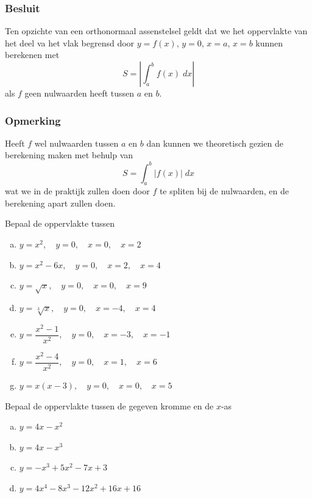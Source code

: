 \documentclass[a4paper,12pt, twoside]{article}
\begin{document}
\subsubsection*{Besluit}

Ten opzichte van een orthonormaal assenstelsel geldt dat we het oppervlakte van het deel va het vlak begrensd door $y=f(x)$, $y=0$, $x=a$, $x=b$ kunnen berekenen met
$$S = |\int_a^b f(x)\;dx|$$
als $f$ geen nulwaarden heeft tussen $a$ en $b$.

\subsubsection*{Opmerking}

Heeft $f$ wel nulwaarden tussen $a$ en $b$ dan kunnen we theoretisch gezien de berekening maken met behulp van
$$S = \int_a^b |f(x)|\;dx$$
wat we in de praktijk zullen doen door $f$ te spliten bij de nulwaarden, en de berekening apart zullen doen.

\begin{oefening}
Bepaal de oppervlakte tussen
\begin{enumerate}[(a)]
\itemsep1em
  \item $\displaystyle y=x^2,\quad y=0,\quad x=0, \quad x=2$
  \item $\displaystyle y=x^2-6x,\quad y=0,\quad x=2, \quad x=4$
  \item $\displaystyle y=\sqrt{x},\quad y=0,\quad x=0, \quad x=9$
  \item $\displaystyle y=\sqrt[3]{x},\quad y=0,\quad x=-4, \quad x=4$
  \item $\displaystyle y=\dfrac{x^2-1}{x^2},\quad y=0,\quad x=-3, \quad x=-1$
  \item $\displaystyle y=\dfrac{x^2-4}{x^2},\quad y=0,\quad x=1, \quad x=6$
  \item $\displaystyle y=x(x-3),\quad y=0,\quad x=0, \quad x=5$
\end{enumerate}
\end{oefening}

\begin{oefening}
Bepaal de oppervlakte tussen de gegeven kromme en de $x$-as
\begin{enumerate}[(a)]
\itemsep1em
  \item $\displaystyle y=4x-x^2$
  \item $\displaystyle y=4x-x^3$
  \item $\displaystyle y=-x^3+5x^2-7x+3$
  \item $\displaystyle y=4x^4-8x^3-12x^2+16x+16$
\end{enumerate}
\end{oefening}
\end{document}

